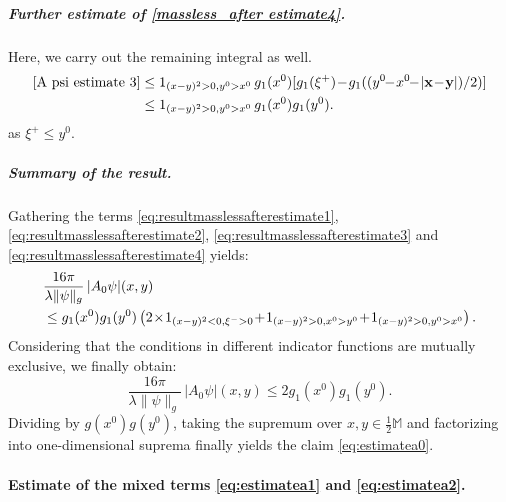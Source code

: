 \documentclass[b5paper,draft,openbib,12pt]{memoir}
\newcommand{\M}{\mathbb{M}}
\newcommand{\vx}{\mathbf{x}}
\newcommand{\vy}{\mathbf{y}}
\begin{document}
\subparagraph{Further estimate of \eqref{massless_after estimate4}.}
Here, we carry out the remaining integral as well.
\begin{align}
	\eqref{A psi estimate 3} &\leq 1_{(x-y)^2>0,y^0>x^0}\, g_1(x^0) [ g_1(\xi^+)\!-\!g_1( (y^0\!\!-\!x^0\!\!-\!|\vx\!-\!\vy|)/2)]\nonumber\\
&\leq 1_{(x-y)^2>0,y^0>x^0}\, g_1(x^0)g_1(y^0).
\label{eq:resultmasslessafterestimate4}
\end{align}
as $\xi^+\leq y^0$.


\subparagraph{Summary of the result.} Gathering the terms 
\eqref{eq:resultmasslessafterestimate1}, 
\eqref{eq:resultmasslessafterestimate2}, 
\eqref{eq:resultmasslessafterestimate3} and 
\eqref{eq:resultmasslessafterestimate4} yields:
\begin{align}
    &\frac{16\pi}{\lambda\|\psi\|_g}\, |A_0 \psi |(x,y) \\
    &\leq g_1(x^0) g_1(y^0) \left( 2 \!\times\! 1_{(x-y)^2 < 0, \xi^- >0} \!+\! 1_{(x-y)^2>0,x^0>y^0} \!+\! 1_{(x-y)^2>0,y^0>x^0}\right).\notag
\end{align}
Considering that the conditions in different indicator functions are mutually 
exclusive, we finally obtain:
\begin{equation}
	  \frac{16\pi}{\lambda\|\psi\|_g}\, |A_0 \psi |(x,y) \leq 2 g_1(x^0) g_1(y^0).
	\label{eq:resultmasslessestimate}
\end{equation}
Dividing by $g(x^0)g(y^0)$, taking the supremum over 
$x,y \in \tfrac{1}{2}\M$ and factorizing into one-dimensional suprema 
finally yields the claim \eqref{eq:estimatea0}.


\paragraph{Estimate of the mixed terms \eqref{eq:estimatea1} and 
\eqref{eq:estimatea2}.} \label{sec:estimatemixed}
\end{document}
